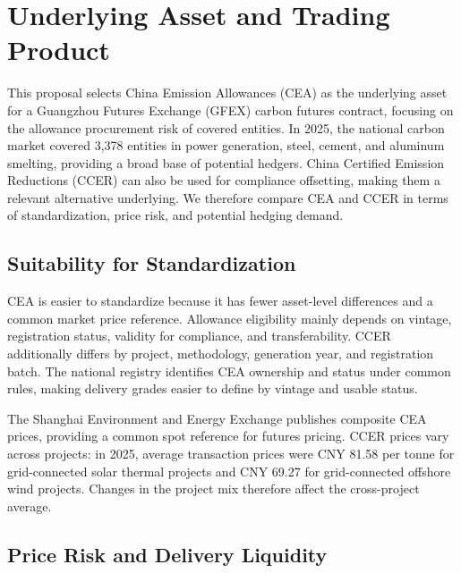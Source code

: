 \documentclass[10pt,a4paper,twocolumn]{article}
\begin{document}

\section{Underlying Asset and Trading Product}
This proposal selects China Emission Allowances (CEA) as the underlying asset for a Guangzhou Futures Exchange (GFEX) carbon futures contract, focusing on the allowance procurement risk of covered entities. In 2025, the national carbon market covered 3,378 entities in power generation, steel, cement, and aluminum smelting\cite{mee2026}, providing a broad base of potential hedgers. China Certified Emission Reductions (CCER) can also be used for compliance offsetting\cite{ccer2023}, making them a relevant alternative underlying. We therefore compare CEA and CCER in terms of standardization, price risk, and potential hedging demand.

\subsection{Suitability for Standardization}

CEA is easier to standardize because it has fewer asset-level differences and a common market price reference. Allowance eligibility mainly depends on vintage, registration status, validity for compliance, and transferability\cite{mee2021reg,mee2024carryover}. CCER additionally differs by project, methodology, generation year, and registration batch\cite{ccer2023}. The national registry identifies CEA ownership and status under common rules\cite{mee2021reg}, making delivery grades easier to define by vintage and usable status.

The Shanghai Environment and Energy Exchange publishes composite CEA prices\cite{she2025daily}, providing a common spot reference for futures pricing. CCER prices vary across projects: in 2025, average transaction prices were CNY 81.58 per tonne for grid-connected solar thermal projects and CNY 69.27 for grid-connected offshore wind projects\cite{ccer2025annual}. Changes in the project mix therefore affect the cross-project average.

\subsection{Price Risk and Delivery Liquidity}
\end{document}
